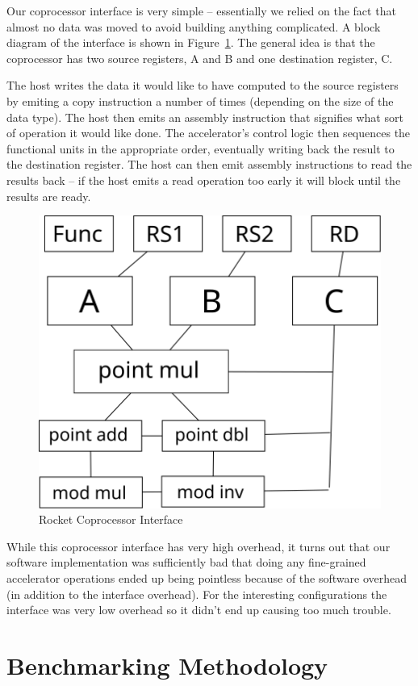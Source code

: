 \documentclass[twocolumn]{article}
\begin{document}
Our coprocessor interface is very simple -- essentially we relied on
the fact that almost no data was moved to avoid building anything
complicated.  A block diagram of the interface is shown in
Figure~\ref{coproc}.  The general idea is that the coprocessor has two
source registers, A and B and one destination register, C.

The host writes the data it would like to have computed to the source
registers by emiting a copy instruction a number of times (depending
on the size of the data type).  The host then emits an assembly
instruction that signifies what sort of operation it would like done.
The accelerator's control logic then sequences the functional units in
the appropriate order, eventually writing back the result to the
destination register.  The host can then emit assembly instructions to
read the results back -- if the host emits a read operation too early
it will block until the results are ready.

\begin{figure}[t]
  \begin{center}
    \includegraphics[width=0.5\linewidth]{coproc.svg}
  \end{center}

  \caption{Rocket Coprocessor Interface
    \label{coproc}}
\end{figure}

While this coprocessor interface has very high overhead, it turns out
that our software implementation was sufficiently bad that doing any
fine-grained accelerator operations ended up being pointless because
of the software overhead (in addition to the interface overhead).  For
the interesting configurations the interface was very low overhead so
it didn't end up causing too much trouble.

\section{Benchmarking Methodology}
\end{document}

